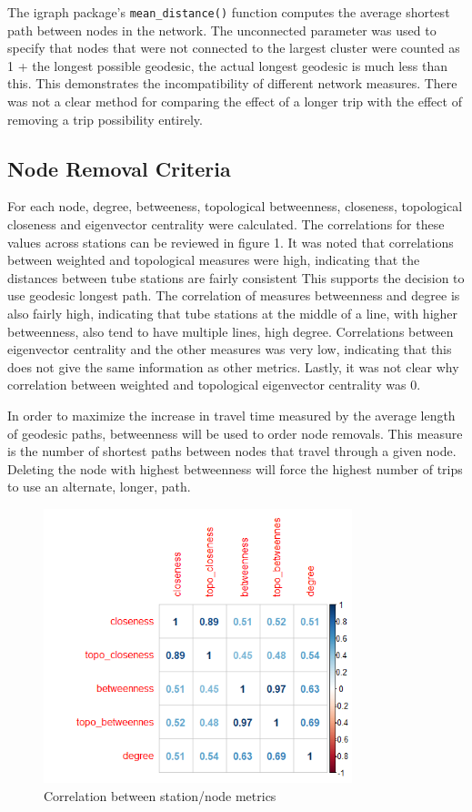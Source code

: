 \documentclass[11pt]{article} %
\begin{document}
The igraph package's \verb!mean_distance()! function computes the average shortest path between nodes in the network. The unconnected parameter was used to specify that nodes that were not connected to the largest cluster were counted as 1 + the longest possible geodesic, the actual longest geodesic is much less than this. This demonstrates the incompatibility of different network measures. There was not a clear method for comparing the effect of a longer trip with the effect of removing a trip possibility entirely. 

\subsection{Node Removal Criteria}

For each node, degree, betweeness, topological betweenness, closeness, topological closeness and eigenvector centrality were calculated. The correlations for these values across stations can be reviewed in figure 1. It was noted that correlations between weighted and topological measures were high, indicating that the distances between tube stations are fairly consistent This supports the decision to use geodesic longest path. The correlation of measures betweenness and degree is also fairly high, indicating that tube stations at the middle of a line, with higher betweenness, also tend to have multiple lines, high degree. Correlations between eigenvector centrality and the other measures was very low, indicating that this does not give the same information as other metrics. Lastly, it was not clear why correlation between weighted and topological eigenvector centrality was 0.

In order to maximize the increase in travel time measured by the average length of geodesic paths, betweenness will be used to order node removals. This measure is the number of shortest paths between nodes that travel through a given node. Deleting the node with highest betweenness will force the highest number of trips to use an alternate, longer, path.  


\begin{figure}
\centering
\includegraphics[width=0.8\textwidth]{cropped_correlations}
\caption{Correlation between station/node metrics}
\end{figure}
\end{document}
